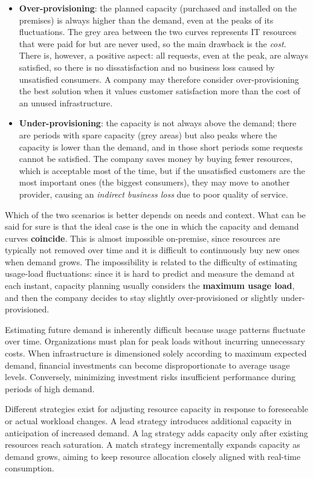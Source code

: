 \begin{itemize}
	\item \textbf{Over-provisioning}: the planned capacity (purchased and installed on the premises) is always higher than the demand, even at the peaks of its fluctuations. The grey area between the two curves represents IT resources that were paid for but are never used, so the main drawback is the \emph{cost}. There is, however, a positive aspect: all requests, even at the peak, are always satisfied, so there is no dissatisfaction and no business loss caused by unsatisfied consumers. A company may therefore consider over-provisioning the best solution when it values customer satisfaction more than the cost of an unused infrastructure.
	\item \textbf{Under-provisioning}: the capacity is not always above the demand; there are periods with spare capacity (grey areas) but also peaks where the capacity is lower than the demand, and in those short periods some requests cannot be satisfied. The company saves money by buying fewer resources, which is acceptable most of the time, but if the unsatisfied customers are the most important ones (the biggest consumers), they may move to another provider, causing an \emph{indirect business loss} due to poor quality of service.
\end{itemize}

Which of the two scenarios is better depends on needs and context. What can be said for sure is that the ideal case is the one in which the capacity and demand curves \textbf{coincide}. This is almost impossible on-premise, since resources are typically not removed over time and it is difficult to continuously buy new ones when demand grows. The impossibility is related to the difficulty of estimating usage-load fluctuations: since it is hard to predict and measure the demand at each instant, capacity planning usually considers the \textbf{maximum usage load}, and then the company decides to stay slightly over-provisioned or slightly under-provisioned.

Estimating future demand is inherently difficult because usage patterns fluctuate over time. Organizations must plan for peak loads without incurring unnecessary costs. When infrastructure is dimensioned solely according to maximum expected demand, financial investments can become disproportionate to average usage levels. Conversely, minimizing investment risks insufficient performance during periods of high demand.

Different strategies exist for adjusting resource capacity in response to foreseeable or actual workload changes. A lead strategy introduces additional capacity in anticipation of increased demand. A lag strategy adds capacity only after existing resources reach saturation. A match strategy incrementally expands capacity as demand grows, aiming to keep resource allocation closely aligned with real-time consumption.

